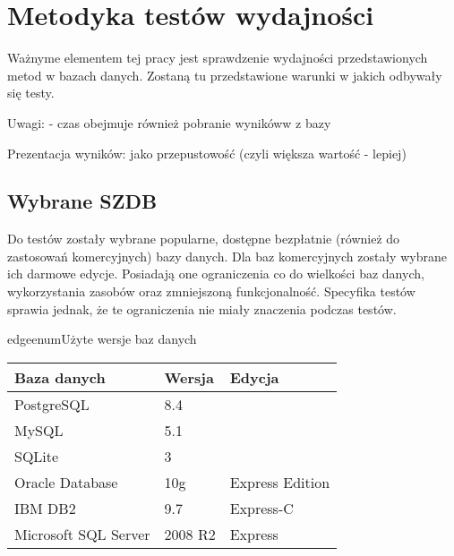 \chapter{Metodyka testów wydajności}

Ważnyme elementem tej pracy jest sprawdzenie wydajności przedstawionych metod w bazach danych.
Zostaną tu przedstawione warunki w jakich odbywały się testy.

Uwagi:
 - czas obejmuje również pobranie wynikóww z bazy

Prezentacja wyników: jako przepustowość (czyli większa wartość - lepiej)

\section{Wybrane SZDB}

Do testów zostały wybrane popularne, dostępne bezpłatnie (również do zastosowań komercyjnych) bazy danych. 
Dla baz komercyjnych zostały wybrane ich darmowe edycje. 
Posiadają one ograniczenia co do wielkości baz danych, wykorzystania zasobów oraz zmniejszoną funkcjonalność. 
Specyfika testów sprawia jednak, że te ograniczenia nie miały znaczenia podczas testów.





\begin{qxtab}{edgeenum}{Użyte wersje baz danych}
\begin{tabular}{l|l|l}
Baza danych                            & Wersja & Edycja \\
\hline
PostgreSQL\index{PostgreSQL}           &  8.4      & \\
MySQL\index{MySQL}                     &  5.1      & \\
SQLite\index{SQLite}                   &  3        & \\
Oracle Database\index{Oracle}          &  10g      & Express Edition \\
IBM DB2\index{IBM DB2}                 &  9.7      & Express-C \\
Microsoft SQL Server\index{SQL Server} &  2008 R2  & Express\\
\end{tabular}
\end{qxtab}

